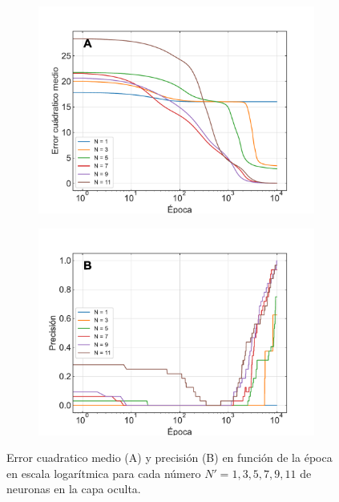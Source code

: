 \documentclass[11pt,twocolumn,twoside]{opticajnl}
\begin{document}
\begin{figure}[ht]
    \centering
         \begin{subfigure}[b]{\linewidth}
            \centering
            \includegraphics[width=\textwidth]{Figuras/mse_ej2.pdf}
         \end{subfigure}
         \begin{subfigure}[b]{\linewidth}
            \centering
            \includegraphics[width=\textwidth]{Figuras/acc_ej2.pdf}
         \end{subfigure}
    \caption{Error cuadratico medio (A) y precisión (B) en función de la época en escala logarítmica para cada número $N' = 1,3,5,7,9,11$ de neuronas en la capa oculta.} 
    \label{fig:2}
\end{figure}
\end{document}
